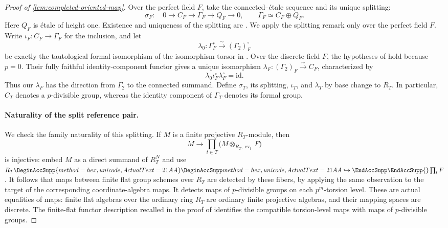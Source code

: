 \documentclass[11pt]{article}
\numberwithin{equation}{section}
\theoremstyle{definition}
\theoremstyle{remark}
\let\UnicodeOriginalHookrightarrow\hookrightarrow
\DeclareRobustCommand{\hookrightarrow}{
  \BeginAccSupp{method=hex,unicode,ActualText=21AA}
  \UnicodeOriginalHookrightarrow\EndAccSupp{}}
\begin{document}
\begin{proof}[Proof of \cref{lem:completed-oriented-map}]
Over the perfect field \(F\), take the connected--étale sequence and its
unique splitting:
\[
 \sigma_F:\quad
 0\longrightarrow C_F\longrightarrow\Gamma_F
 \longrightarrow Q_F\longrightarrow0,
 \qquad \Gamma_F\simeq C_F\oplus Q_F .
\]
Here \(Q_F\) is étale of height one. Existence and uniqueness of the
splitting are
\cite[Proposition~2.5.20 and Remark~2.5.24]{LurieEllipticII2018}.
We apply the splitting remark only over the perfect field \(F\).
Write \(\iota_F:C_F\to\Gamma_F\) for the inclusion, and let
\[
 \lambda_0:\Gamma_F^\circ\xrightarrow{\sim}(\Gamma_2)_F^\circ
\]
be exactly the tautological formal isomorphism of the isomorphism torsor
in \cite[Example~4.6.3]{BMR2026}. Over the discrete field \(F\), the
hypotheses of
\cite[Theorem~2.3.12 and Corollary~2.3.13]{LurieEllipticII2018} hold because
\(p=0\). Their fully faithful identity-component functor gives a unique
isomorphism
\(\lambda_F:(\Gamma_2)_F\xrightarrow{\sim}C_F\), characterized by
\[
 \lambda_0\iota_F^\circ\lambda_F^\circ=\mathrm{id}.
\]
Thus our \(\lambda_F\) has the direction from \(\Gamma_2\) to the
connected summand. Define \(\sigma_T\), its splitting, \(\iota_T\), and
\(\lambda_T\) by base change to \(R_T\). In particular, \(C_T\) denotes
a \(p\)-divisible group, whereas the identity component of \(\Gamma_T\) denotes its formal group.

\paragraph{Naturality of the split reference pair.}
We check the family naturality of this splitting. If \(M\) is a finite
projective \(R_T\)-module, then
\[
 M\longrightarrow
 \prod_{t\in T}\bigl(M\otimes_{R_T,\operatorname{ev}_t}F\bigr)
\]
is injective: embed \(M\) as a direct summand of \(R_T^N\) and use
\(R_T\hookrightarrow\prod_tF\). It follows that maps between finite flat
group schemes over \(R_T\) are detected by these fibers, by applying the
same observation to the target of the corresponding coordinate-algebra
maps. It detects maps of \(p\)-divisible groups on each \(p^m\)-torsion
level. These are actual equalities of maps: finite flat algebras over the
ordinary ring \(R_T\) are ordinary finite projective algebras, and their
mapping spaces are discrete. The finite-flat functor description recalled
in the proof of \cite[Proposition~2.5.20]{LurieEllipticII2018} identifies
the compatible torsion-level maps with maps of \(p\)-divisible groups.


\end{proof}
\end{document}
